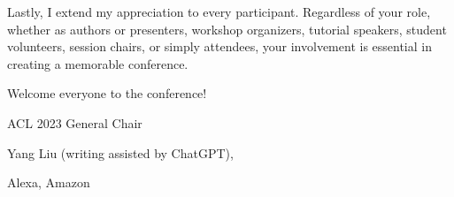 Lastly, I extend my appreciation to every participant. Regardless of your role, whether as authors or presenters, workshop organizers, tutorial speakers, student volunteers, session chairs, or simply attendees, your involvement is essential in creating a memorable conference. 

Welcome everyone to the conference!

\vspace{2ex}

ACL 2023 General Chair

Yang Liu (writing assisted by ChatGPT), 

Alexa, Amazon

\clearpage
